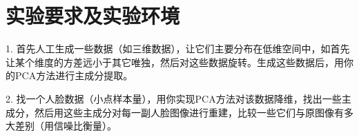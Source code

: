 \section{实验要求及实验环境}

1. 首先人工生成一些数据（如三维数据），让它们主要分布在低维空间中，如首先让某个维度的方差远小于其它唯独，然后对这些数据旋转。生成这些数据后，用你的PCA方法进行主成分提取。

2. 找一个人脸数据（小点样本量），用你实现PCA方法对该数据降维，找出一些主成分，然后用这些主成分对每一副人脸图像进行重建，比较一些它们与原图像有多大差别（用信噪比衡量）。
